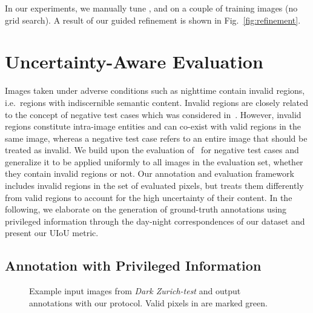 \documentclass[10pt,twocolumn,letterpaper]{article}
\begin{document}
In our experiments, we manually tune ,  and  on a couple of training images (no grid search). A result of our guided refinement is shown in Fig.~\ref{fig:refinement}.



\section{Uncertainty-Aware Evaluation}
\label{sec:evaluation} 

Images taken under adverse conditions such as nighttime contain invalid regions, i.e.\ regions with indiscernible semantic content. Invalid regions are closely related to the concept of negative test cases which was considered in~\cite{wilddash}. However, invalid regions constitute intra-image entities and can co-exist with valid regions in the same image, whereas a negative test case refers to an entire image that should be treated as invalid. We build upon the evaluation of~\cite{wilddash} for negative test cases and generalize it to be applied uniformly to all images in the evaluation set, whether they contain invalid regions or not. Our annotation and evaluation framework includes invalid regions in the set of evaluated pixels, but treats them differently from valid regions to account for the high uncertainty of their content. In the following, we elaborate on the generation of ground-truth annotations using privileged information through the day-night correspondences of our dataset and present our UIoU metric.

\subsection{Annotation with Privileged Information}
\label{sec:evaluation:annotation}



\begin{figure*}
    \centering
    \label{fig:annotation:input}
    \hfil
    \label{fig:annotation:auxiliary}
    \hfil
    \label{fig:annotation:invalid}
    \hfil
    \label{fig:annotation:gt}
    \caption{Example input images from \emph{Dark Zurich-test} and output annotations with our protocol. Valid pixels in  are marked green.}
    \label{fig:annotation}
\end{figure*}
\end{document}
